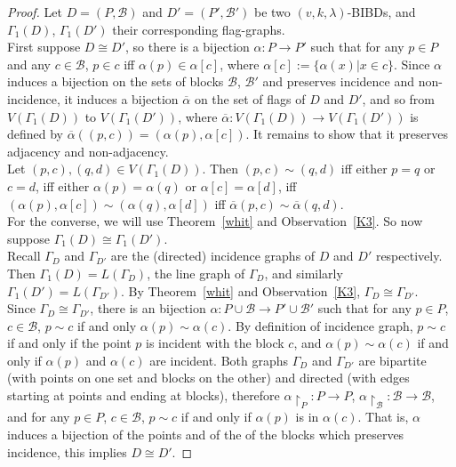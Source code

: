 \documentclass[letterpaper,10pt]{article}
\theoremstyle{plain}
\theoremstyle{definition}
\begin{document}
\begin{proof}
    Let $D=(P,\mathcal{B})$ and $D'=(P',\mathcal{B}')$ be two $(v,k,\lambda)$-BIBDs, and $\Gamma_1(D)$, $\Gamma_1(D')$ their corresponding flag-graphs.\\
    
   First suppose $D\cong D'$, so there is a bijection $\alpha:P\to P'$ such that for any $p\in P$ and any $c\in\mathcal{B}$, $p\in c$ iff $\alpha(p)\in\alpha[c]$, where $\alpha[c]:=\{\alpha(x) | x\in c\}$. Since $\alpha$ induces a bijection on the sets of blocks $\mathcal{B}$, $\mathcal{B'}$ and preserves incidence and non-incidence, it induces a bijection $\overline{\alpha}$ on the set of flags of $D$ and $D'$, and so from $V(\Gamma_1(D))$ to $V(\Gamma_1(D'))$, where $\overline{\alpha}:V(\Gamma_1(D))\to V(\Gamma_1(D'))$ is defined by $\overline{\alpha}((p,c))=(\alpha(p),\alpha[c])$. It remains to show that it preserves adjacency and non-adjacency.\\
    Let $(p,c),(q,d)\in V(\Gamma_1(D))$. Then $(p,c)\sim(q,d)$ iff either $p=q$ or $c=d$, iff either $\alpha(p)=\alpha(q)$ or $\alpha[c]=\alpha[d]$, iff $(\alpha(p),\alpha[c])\sim(\alpha(q),\alpha[d])$ iff $\overline{\alpha}(p,c)\sim\overline{\alpha}(q,d)$.\\


For the converse, we will use Theorem~\ref{whit} and Observation~\ref{K3}. So now suppose $\Gamma_1(D)\cong\Gamma_1(D')$.\\

    Recall $\Gamma_D$ and $\Gamma_{D'}$ are the (directed) incidence graphs of $D$ and $D'$ respectively. Then $\Gamma_1(D)=L(\Gamma_D)$, the line graph of $\Gamma_D$, and similarly $\Gamma_1(D')=L(\Gamma_{D'})$. By Theorem~\ref{whit} and Observation~\ref{K3}, $\Gamma_D\cong\Gamma_{D'}$.\\

    Since $\Gamma_D\cong\Gamma_{D'}$, there is an bijection $\alpha:P\cup \mathcal{B}\to P'\cup \mathcal{B}'$ such that for any $p\in P$, $c\in \mathcal{B}$, $p\sim c$ if and only $\alpha(p)\sim \alpha(c)$. By definition of incidence graph, $p\sim c$ if and only if the point $p$ is incident with the block $c$, and $\alpha(p)\sim \alpha(c)$ if and only if $\alpha(p)$ and $\alpha(c)$ are incident. Both graphs $\Gamma_D$ and $\Gamma_{D'}$ are bipartite (with points on one set and blocks on the other) and directed (with edges starting at points and ending at blocks), therefore $\alpha\restriction _P:P\to P$, $\alpha\restriction _\mathcal{B}:\mathcal{B}\to\mathcal{B}$, and for any $p\in P$, $c\in \mathcal{B}$, $p\sim c$ if and only if $\alpha(p)$ is in $\alpha(c)$. That is, $\alpha$ induces a bijection of the points and of the of the blocks which preserves incidence, this implies $D\cong D'$.
\end{proof} 
\end{document}
